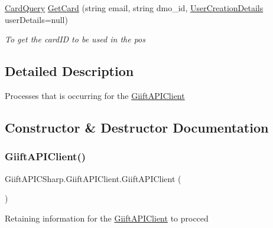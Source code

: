 \begin{DoxyCompactItemize}
\hyperlink{class_giift_a_p_i_c_sharp_1_1_card_query}{Card\+Query} \hyperlink{class_giift_a_p_i_c_sharp_1_1_giift_a_p_i_client_a103157caef33f0ca64a935f99a7f5c18}{Get\+Card} (string email, string dmo\+\_\+id, \hyperlink{class_giift_a_p_i_c_sharp_1_1_user_creation_details}{User\+Creation\+Details} user\+Details=null)
\begin{DoxyCompactList}\small\item\em To get the card\+ID to be used in the pos \end{DoxyCompactList}\end{DoxyCompactItemize}


\subsection{Detailed Description}
Processes that is occurring for the \hyperlink{class_giift_a_p_i_c_sharp_1_1_giift_a_p_i_client}{Giift\+A\+P\+I\+Client} 



\subsection{Constructor \& Destructor Documentation}
\mbox{\label{class_giift_a_p_i_c_sharp_1_1_giift_a_p_i_client_ac49da1be3ebd8564216b7ef79cdf41ea}} 
\subsubsection{\texorpdfstring{Giift\+A\+P\+I\+Client()}{GiiftAPIClient()}}
{\footnotesize\ttfamily Giift\+A\+P\+I\+C\+Sharp.\+Giift\+A\+P\+I\+Client.\+Giift\+A\+P\+I\+Client (\begin{DoxyParamCaption}{ }\end{DoxyParamCaption})\hspace{0.3cm}{\ttfamily [inline]}}



Retaining information for the \hyperlink{class_giift_a_p_i_c_sharp_1_1_giift_a_p_i_client}{Giift\+A\+P\+I\+Client} to procced 



